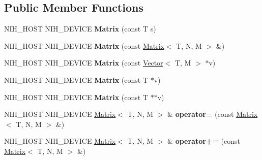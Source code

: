 \subsection*{\-Public \-Member \-Functions}
\begin{DoxyCompactItemize}
\item 
\hypertarget{group__linalg_gad99cac2fa7a266adca8e5465f27025cc}{
\-N\-I\-H\-\_\-\-H\-O\-S\-T \-N\-I\-H\-\_\-\-D\-E\-V\-I\-C\-E {\bfseries \-Matrix} (const \-T s)}
\label{group__linalg_gad99cac2fa7a266adca8e5465f27025cc}

\item 
\hypertarget{group__linalg_gaa7cf9f899c88482c15424af1275d6d08}{
\-N\-I\-H\-\_\-\-H\-O\-S\-T \-N\-I\-H\-\_\-\-D\-E\-V\-I\-C\-E {\bfseries \-Matrix} (const \hyperlink{structnih_1_1_matrix}{\-Matrix}$<$ \-T, \-N, \-M $>$ \&)}
\label{group__linalg_gaa7cf9f899c88482c15424af1275d6d08}

\item 
\hypertarget{group__linalg_ga601e9514aa1a6e2e23b470be0e5fb4a5}{
\-N\-I\-H\-\_\-\-H\-O\-S\-T \-N\-I\-H\-\_\-\-D\-E\-V\-I\-C\-E {\bfseries \-Matrix} (const \hyperlink{structnih_1_1_vector}{\-Vector}$<$ \-T, \-M $>$ $\ast$v)}
\label{group__linalg_ga601e9514aa1a6e2e23b470be0e5fb4a5}

\item 
\hypertarget{group__linalg_ga3976c6f3ec3cf25394d133f7b87b885e}{
\-N\-I\-H\-\_\-\-H\-O\-S\-T \-N\-I\-H\-\_\-\-D\-E\-V\-I\-C\-E {\bfseries \-Matrix} (const \-T $\ast$v)}
\label{group__linalg_ga3976c6f3ec3cf25394d133f7b87b885e}

\item 
\hypertarget{group__linalg_gae3c59b44be7eeb23031a3d614fb6fb19}{
\-N\-I\-H\-\_\-\-H\-O\-S\-T \-N\-I\-H\-\_\-\-D\-E\-V\-I\-C\-E {\bfseries \-Matrix} (const \-T $\ast$$\ast$v)}
\label{group__linalg_gae3c59b44be7eeb23031a3d614fb6fb19}

\item 
\hypertarget{group__linalg_ga0dbf1c87533b9e9f78c6421ae43c33ec}{
\-N\-I\-H\-\_\-\-H\-O\-S\-T \-N\-I\-H\-\_\-\-D\-E\-V\-I\-C\-E \hyperlink{structnih_1_1_matrix}{\-Matrix}$<$ \-T, \*
\-N, \-M $>$ \& {\bfseries operator=} (const \hyperlink{structnih_1_1_matrix}{\-Matrix}$<$ \-T, \-N, \-M $>$ \&)}
\label{group__linalg_ga0dbf1c87533b9e9f78c6421ae43c33ec}

\item 
\hypertarget{group__linalg_ga08b2e9e0a7182126090bde9bc9744458}{
\-N\-I\-H\-\_\-\-H\-O\-S\-T \-N\-I\-H\-\_\-\-D\-E\-V\-I\-C\-E \hyperlink{structnih_1_1_matrix}{\-Matrix}$<$ \-T, \*
\-N, \-M $>$ \& {\bfseries operator+=} (const \hyperlink{structnih_1_1_matrix}{\-Matrix}$<$ \-T, \-N, \-M $>$ \&)}
\label{group__linalg_ga08b2e9e0a7182126090bde9bc9744458}


\end{DoxyCompactItemize}
